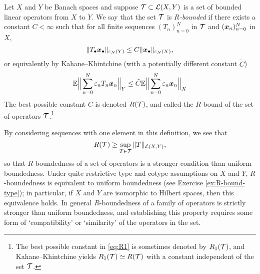\begin{defn}
  Let $X$ and $Y$ be Banach spaces and suppose $\mathcal{T} \subset \mathcal{L}(X,Y)$ is a set of bounded linear operators from $X$ to $Y$.
We say that the set $\mathcal{T}$ is \emph{$R$-bounded} if there exists a constant $C < \infty$ such that for all finite sequences $(T_{n})_{n=0}^{N}$ in $\mathcal{T}$ and $(\bm{x}_{n})_{n=0}^{N}$ in $X$,
\begin{equation*}
  \|T_{\bullet} \bm{x}_{\bullet}\|_{\varepsilon_{N}(Y)} \leq C \|\bm{x}_{\bullet}\|_{\varepsilon_{N}(X)},
\end{equation*}
or equivalently by Kahane--Khintchine (with a potentially different constant $\tilde{C}$)
\begin{equation}\label{eq:R1}
  \mathbb{E} \Big\| \sum_{n=0}^{N} \varepsilon_{n} T_{n} \bm{x}_{n} \Big\|_{Y} \leq \tilde{C} \mathbb{E} \Big\| \sum_{n=0}^{N} \varepsilon_{n}  \bm{x}_{n} \Big\|_{X}
\end{equation}
The best possible constant $C$ is denoted $R(\mathcal{T})$, and called the $R$-bound of the set of operators $\mathcal{T}$.\footnote{The best possible constant in \eqref{eq:R1} is sometimes denoted by $R_{1}(\mathcal{T})$, and Kahane--Khintchine yields $R_{1}(\mathcal{T}) \simeq R(\mathcal{T})$ with a constant independent of the set $\mathcal{T}$.}
\end{defn}

By considering sequences with one element in this definition, we see that
\begin{equation*}
  R(\mathcal{T}) \geq \sup_{T \in \mathcal{T}} \|T\|_{\mathcal{L}(X,Y)},
\end{equation*}
so that $R$-boundedness of a set of operators is a stronger condition than uniform boundedness.
Under quite restrictive type and cotype assumptions on $X$ and $Y$, $R$-boundedness is equivalent to uniform boundedness (see Exercise \ref{ex:R-bound-type}); in particular, if $X$ and $Y$ are isomorphic to Hilbert spaces, then this equivalence holds.
In general $R$-boundedness of a family of operators is strictly stronger than uniform boundedness, and establishing this property requires some form of `compatibility' or `similarity' of the operators in the set.

